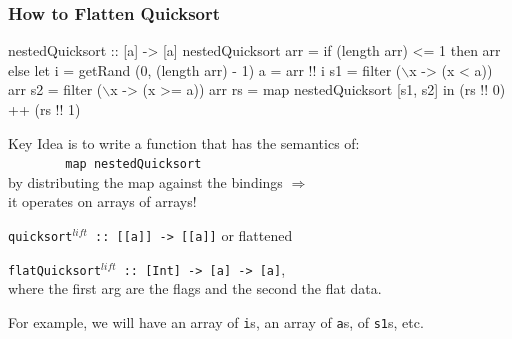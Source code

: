 \documentclass{beamer}
\newcommand{\emp}[1]{\textcolor{DikuRed}{ #1}}
\newcommand{\mymath}[1]{$ #1 $}
\begin{document}
\begin{frame}[fragile,t]
  \frametitle{How to Flatten Quicksort}

\begin{colorcode}[fontsize=\scriptsize]
nestedQuicksort :: [a] -> [a]
nestedQuicksort arr = 
  if (length arr) <= 1 then arr else 
  let i = getRand (0, (length arr) - 1)
      a = arr !! i
      s1 = filter (\mymath{\backslash}x -> (x <  a)) arr
      s2 = filter (\mymath{\backslash}x -> (x >= a)) arr
      rs = \alert{map nestedQuicksort} [s1, s2]
  in  (rs !! 0) ++ (rs !! 1)
\end{colorcode}

\alert{Key Idea} is to write a function that
has the semantics of:\\ 
{\tt~~~~~~~~map nestedQuicksort}\\
by distributing the map against the bindings $\Rightarrow$\\ 
\alert{it operates on arrays of arrays!}
\medskip

{\tt quicksort$^{lift}$ :: [[a]] -> [[a]]} or flattened\\
\medskip

{\tt flatQuicksort$^{lift}$ :: [Int] -> [a] -> [a]},\\
where the first arg are the flags and the second the flat data.
\medskip

\emp{For example, we will have an array of {\tt i}s, an array of {\tt a}s,
of {\tt s1}s, etc.}
\end{frame}
\end{document}
